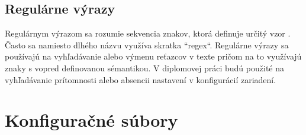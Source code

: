  \subsection{Regulárne výrazy}
 Regulárnym výrazom sa rozumie sekvencia znakov, ktorá definuje určitý vzor \cite{sBBUt3Q3bPUfAMue}. Často sa namiesto dlhého názvu využíva skratka ``regex``. Regulárne výrazy sa používajú na vyhľadávanie alebo výmenu reťazcov v texte pričom na to využívajú znaky s vopred definovanou sémantikou. V diplomovej práci budú použité na vyhľadávanie prítomnosti alebo absencii nastavení v konfigurácií zariadení. 

\section{Konfiguračné súbory}
